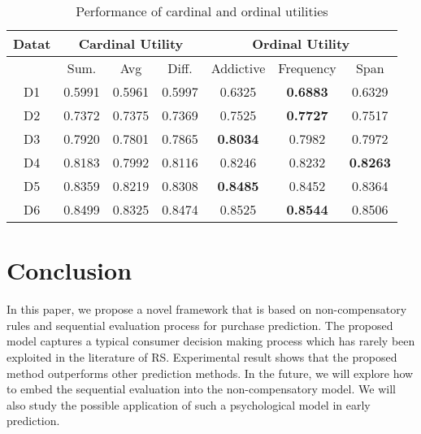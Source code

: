 \documentclass[sigconf]{acmart}
\begin{document}
\begin{table}[htbp]
\caption{Performance of cardinal and ordinal utilities}
\label{tab:utility}
\begin{tabular}{|c|c|c|c|c|c|c|}
\hline
{Datat} & \multicolumn{3}{|c|}{Cardinal Utility} & \multicolumn{3}{|c|}{Ordinal Utility} \\\hline
 &  Sum. & Avg & Diff. & Addictive  & Frequency &Span \\\hline
D1 & 0.5991	&0.5961&	0.5997	&0.6325	&\bf{0.6883}	&0.6329\\\hline
D2 & 0.7372	&0.7375&	0.7369&	0.7525	&\bf{0.7727}	&0.7517\\\hline
D3 & 0.7920&	0.7801	&0.7865	&\bf{0.8034}&	0.7982&0.7972\\\hline
D4 &0.8183&	0.7992	&0.8116	&0.8246&	0.8232	&\bf{0.8263} \\\hline
D5& 0.8359	&0.8219&	0.8308&	\bf{0.8485}&	0.8452&0.8364\\\hline
D6 & 0.8499	&0.8325	&0.8474&	0.8525&	\bf{0.8544}&	0.8506
\\ \hline \end{tabular}
\end{table}


\section{Conclusion}\label{sec:conclusion}
In this paper, we propose a novel framework that is based on non-compensatory rules and sequential evaluation process for purchase prediction. The proposed model captures a typical consumer decision making process which has rarely been exploited in the literature of RS. Experimental result shows that the proposed method outperforms other prediction methods. In the future, we will explore how to embed the sequential evaluation into the non-compensatory model. We will also study the possible application of such a psychological model in early prediction.
\end{document}
